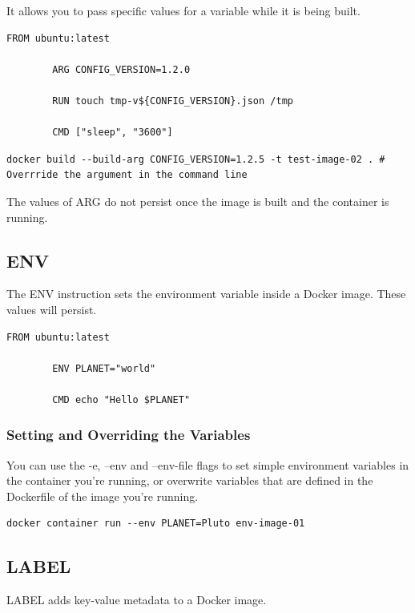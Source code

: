 \documentclass[11pt]{book}
\begin{document}
    It allows you to pass specific values for a variable while it is being built.

    \begin{lstlisting}[style=dockerstyle,caption={Example Dockerfile}]
        FROM ubuntu:latest

        ARG CONFIG_VERSION=1.2.0

        RUN touch tmp-v${CONFIG_VERSION}.json /tmp

        CMD ["sleep", "3600"]
    \end{lstlisting}

    \begin{lstlisting}[style=terminal]
        docker build --build-arg CONFIG_VERSION=1.2.5 -t test-image-02 . # Overrride the argument in the command line
    \end{lstlisting}

    The values of ARG do not persist once the image is built and the container is running.

    \subsection{ENV}

    The ENV instruction sets the environment variable inside a Docker image.
    These values will persist.

    \begin{lstlisting}[style=dockerstyle,caption={Example Dockerfile}]
        FROM ubuntu:latest

        ENV PLANET="world"

        CMD echo "Hello $PLANET"
    \end{lstlisting}

    \subsubsection{Setting and Overriding the Variables}
    You can use the -e, --env and --env-file flags to set simple environment variables in the container you're running,
    or overwrite variables that are defined in the Dockerfile of the image you're running.

    \begin{lstlisting}[style=terminal]
        docker container run --env PLANET=Pluto env-image-01
    \end{lstlisting}

    \subsection{LABEL}
    LABEL adds key-value metadata to a Docker image.
\end{document}
